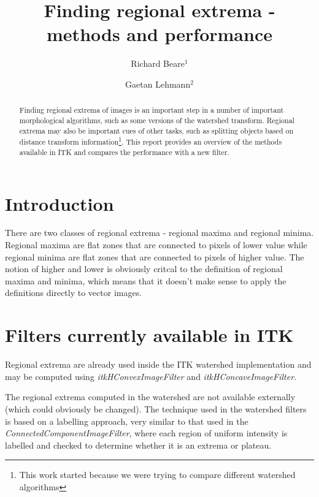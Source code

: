 \documentclass{llncs}
\begin{document}
\title{Finding regional extrema - methods and performance}
\author{Richard Beare{$^1$} \and Gaetan Lehmann{$^2$}}
\maketitle

\begin{abstract}
Finding regional extrema of images is an important step in a number of
important morphological algorithms, such as some versions of the
watershed transform. Regional extrema may also be important cues of
other tasks, such as splitting objects based on distance transform
information\footnote{This work started because we were trying to
compare different watershed algorithms}. This report provides an
overview of the methods available in ITK and compares the performance
with a new filter.
\end{abstract}

\section{Introduction}
There are two classes of regional extrema - regional maxima and
regional minima. Regional maxima are flat zones that are connected to
pixels of lower value while regional minima are flat zones that are
connected to pixels of higher value. The notion of higher and lower is
obviously critcal to the definition of regional maxima and minima,
which means that it doesn't make sense to apply the definitions
directly to vector images.

\section{Filters currently available in ITK}
Regional extrema are already used inside the ITK watershed
implementation and may be computed using {\em itkHConvexImageFilter}
and {\em itkHConcaveImageFilter}. 

The regional extrema computed in the watershed are not available
externally (which could obviously be changed). The technique used in
the watershed filters is based on a labelling approach, very similar
to that used in the {\em ConnectedComponentImageFilter}, where each
region of uniform intensity is labelled and checked to determine
whether it is an extrema or plateau.
\end{document}
